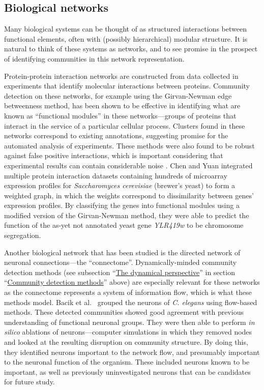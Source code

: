 \hypertarget{biological-networks}{\subsection{Biological
networks}\label{biological-networks}}

Many biological systems can be thought of as structured interactions
between functional elements, often with (possibly hierarchical) modular
structure. It is natural to think of these systems as networks, and to
see promise in the prospect of identifying communities in this network
representation.

Protein-protein interaction networks are constructed from data collected
in experiments that identify molecular interactions between proteins.
Community detection on these networks, for example using the
Girvan-Newman edge betweenness method, has been shown to be effective in
identifying what are known as ``functional modules'' in these
networks---groups of proteins that interact in the service of a
particular cellular process. Clusters found in these networks correspond
to existing annotations, suggesting promise for the automated analysis
of experiments. These methods were also found to be robust against false
positive interactions, which is important considering that experimental
results can contain considerable noise \autocite{dunn_use_2005}. Chen
and Yuan \autocite{chen_detecting_2006} integrated multiple protein
interaction datasets containing hundreds of microarray expression
profiles for \emph{Saccharomyces cerevisiae} (brewer's yeast) to form a
weighted graph, in which the weights correspond to dissimilarity between
genes' expression profiles. By classifying the genes into functional
modules using a modified version of the Girvan-Newman method, they were
able to predict the function of the as-yet not annotated yeast gene
\emph{YLR419w} to be chromosome segregation.

Another biological network that has been studied is the directed network
of neuronal connections---the ``connectome''. Dynamically-minded
community detection methods (see subsection
``\protect\hyperlink{the-dynamical-perspective}{The dynamical
perspective}'' in section
``\protect\hyperlink{community-detection-methods}{Community detection
methods}'' above) are especially relevant for these networks as the
connectome represents a system of information flow, which is what these
methods model. Bacik et al.~\autocite{bacik_flow-based_2016} grouped the
neurons of \emph{C. elegans} using flow-based methods. These detected
communities showed good agreement with previous understanding of
functional neuronal groups. They were then able to perform \emph{in
silico} ablations of neurons---computer simulations in which they
removed nodes and looked at the resulting disruption on community
structure. By doing this, they identified neurons important to the
network flow, and presumably important to the neuronal function of the
organism. These included neurons known to be important, as well as
previously uninvestigated neurons that can be candidates for future
study.

